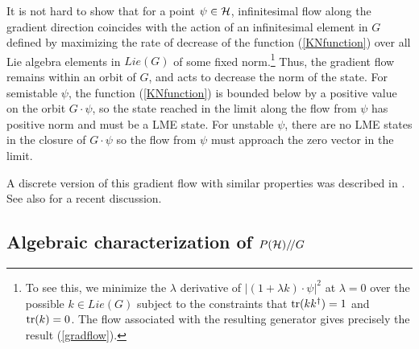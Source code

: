 \documentclass[12pt]{article}
\theoremstyle{definition}
\newcommand{\tr}{{\rm tr}}
\newcommand{\GITquot}{/\!/}
\begin{document}
It is not hard to show that for a point $\psi \in {\cal H}$, infinitesimal flow along the gradient direction coincides with the action of an infinitesimal element in $G$ defined by maximizing the rate of decrease of the function (\ref{KNfunction}) over all Lie algebra elements in $Lie(G)$ of some fixed norm.\footnote{To see this, we minimize the $\lambda$ derivative of $|(1 + \lambda k) \cdot \psi|^2$ at $\lambda = 0$ over the possible $k \in Lie(G)$ subject to the constraints that $\tr(k k^\dagger) = 1$ and $\tr(k) = 0$. The flow associated with the resulting generator gives precisely the result (\ref{gradflow}).}  Thus, the gradient flow remains within an orbit of $G$, and acts to decrease the norm of the state. For semistable $\psi$, the function (\ref{KNfunction}) is bounded below by a positive value on the orbit $G \cdot \psi$, so the state reached in the limit along the flow from $\psi$ has positive norm and must be a LME state. For unstable $\psi$, there are no LME states in the closure of $G \cdot \psi$ so the flow from $\psi$ must approach the zero vector in the limit.

A discrete version of this gradient flow with similar properties was described in \cite{VDD}. See also \cite{BGOWW} for a recent discussion.

\subsection{Algebraic characterization of $P({\cal H})\GITquot G$}
\end{document}
